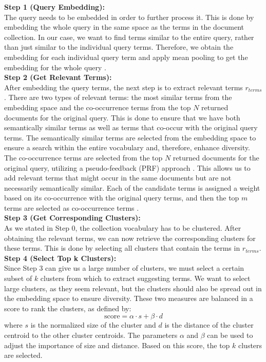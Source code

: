 \textbf{Step 1 (Query Embedding):}\\
The query needs to be embedded in order to further process it. This is done by embedding the whole query in the same space as the terms in the document collection. In our case, we want to find terms similar to the entire query, rather than just similar to the individual query terms. Therefore, we obtain the embedding for each individual query term and apply mean pooling to get the embedding for the whole query \cite{chen2018enhancing}.\\

\textbf{Step 2 (Get Relevant Terms):}\\
After embedding the query terms, the next step is to extract relevant terms $r_{terms}$. There are two types of relevant terms: the most similar terms from the embedding space and the co-occurrence terms from the top $N$ returned documents for the original query. This is done to ensure that we have both semantically similar terms as well as terms that co-occur with the original query terms.  
The semantically similar terms are selected from the embedding space to ensure a search within the entire vocabulary and, therefore, enhance diversity.  
The co-occurrence terms are selected from the top $N$ returned documents for the original query, utilizing a pseudo-feedback (PRF) approach \cite{azad2019query}. This allows us to add relevant terms that might occur in the same documents but are not necessarily semantically similar.  
Each of the candidate terms is assigned a weight based on its co-occurrence with the original query terms, and then the top $m$ terms are selected as co-occurrence terms \cite{azad2019query}.\\

\textbf{Step 3 (Get Corresponding Clusters):}\\
As we stated in Step 0, the collection vocabulary has to be clustered. After obtaining the relevant terms, we can now retrieve the corresponding clusters for these terms. This is done by selecting all clusters that contain the terms in $r_{terms}$.\\

\textbf{Step 4 (Select Top k Clusters):}\\
Since Step 3 can give us a large number of clusters, we must select a certain subset of $k$ clusters from which to extract suggesting terms. We want to select large clusters, as they seem relevant, but the clusters should also be spread out in the embedding space to ensure diversity. These two measures are balanced in a score to rank the clusters, as defined by:  
$$\text{score} = \alpha \cdot s + \beta \cdot d$$  
where $s$ is the normalized size of the cluster and $d$ is the distance of the cluster centroid to the other cluster centroids. The parameters $\alpha$ and $\beta$ can be used to adjust the importance of size and distance. Based on this score, the top $k$ clusters are selected.\\


